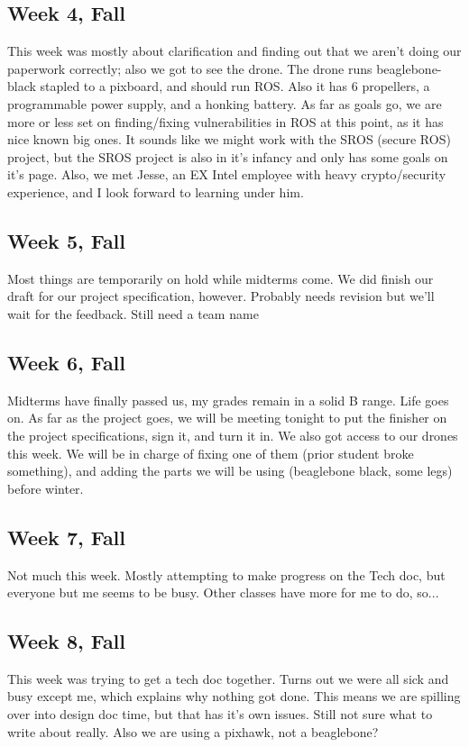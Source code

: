 \documentclass[IEEEtran,letterpaper,10pt,notitlepage,draftclsnofoot,onecolumn]{article}
\begin{document}
\subsection{Week 4, Fall}
This week was mostly about clarification and finding out that we aren't doing 
our paperwork correctly; also we got to see the drone. The drone runs 
beaglebone-black stapled to a pixboard, and should run ROS. Also it has 6 
propellers, a programmable power supply, and a honking battery. 
As far as goals go, we are more or less set on finding/fixing vulnerabilities 
in ROS at this point, as it has nice known big ones. It sounds like we might 
work with the SROS (secure ROS) project, but the SROS project is also in it's 
infancy and only has some goals on it's page. Also, we met Jesse, an EX Intel 
employee with heavy crypto/security experience, and I look forward to learning 
under him.
\subsection{Week 5, Fall}
Most things are temporarily on hold while midterms come. We did finish our 
draft for our project specification, however. Probably needs revision but 
we'll wait for the feedback. Still need a team name
\subsection{Week 6, Fall}
Midterms have finally passed us, my grades remain in a solid B range. Life 
goes on. As far as the project goes, we will be meeting tonight to put the 
finisher on the project specifications, sign it, and turn it in. We also got 
access to our drones this week. We will be in charge of fixing one of them 
(prior student broke something), and adding the parts we will be using 
(beaglebone black, some legs) before winter.
\subsection{Week 7, Fall}
Not much this week. Mostly attempting to make progress on the Tech doc, 
but everyone but me seems to be busy. Other classes have more for me to do, 
so...
\subsection{Week 8, Fall}
This week was trying to get a tech doc together. Turns out we were all sick 
and busy except me, which explains why nothing got done. This means we are 
spilling over into design doc time, but that has it's own issues. Still 
not sure what to write about really. Also we are using a pixhawk, not a 
beaglebone? 
\end{document}
